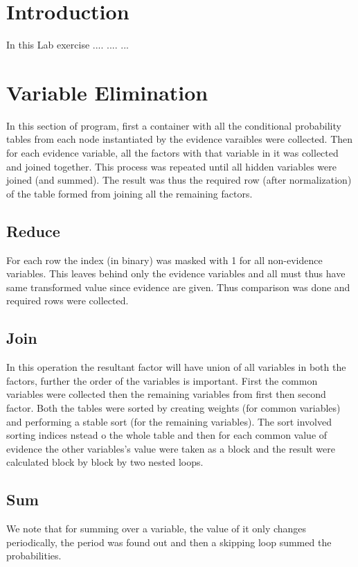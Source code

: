 \documentclass[12pt]{article}
\begin{document}
\maketitle

\section{Introduction}
In this Lab exercise .... .... ... 

\section{Variable Elimination}
In this section of program, first a container with all the conditional probability tables from each node instantiated by the evidence varaibles were collected. Then for each evidence variable, all the factors with that variable in it was collected and joined together. This process was repeated until all hidden variables were joined (and summed). The result was thus the required row (after normalization) of the table formed from joining all the remaining factors.

\subsection{Reduce}
For each row the index (in binary) was masked with 1 for all non-evidence variables. This leaves behind only the evidence variables and all must thus have same transformed value since evidence are given. Thus comparison was done and required rows were collected.

\subsection{Join}
In this operation the resultant factor will have union of all variables in both the factors, further the order of the variables is important. First the common variables were collected then the remaining variables from first then second factor. Both the tables were sorted by creating weights (for common variables) and performing a stable sort (for the remaining variables). The sort involved sorting indices nstead o the whole table and then for each common value of evidence the other variables's value were taken as a block and the result were calculated block by block by two nested loops.

\subsection{Sum}
We note that for summing over a variable, the value of it only changes periodically, the period was found out and then a skipping loop summed the probabilities.
\end{document}
